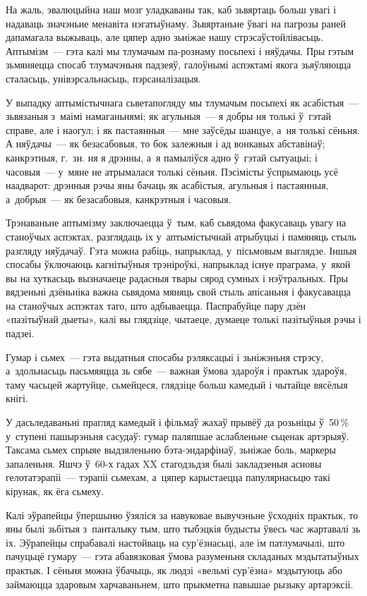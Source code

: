 На жаль, эвалюцыйна наш мозг уладкаваны так, каб зьвяртаць больш увагі і надаваць значэньне менавіта нэгатыўнаму. Зьвяртаньне ўвагі на пагрозы раней дапамагала выжываць, але цяпер адно зьніжае нашу стрэсаўстойлівасьць. Аптымізм~--- гэта калі мы тлумачым па-рознаму посьпехі і няўдачы. Пры гэтым зьмяняецца спосаб тлумачэньня падзеяў, галоўнымі аспэктамі якога зьяўляюцца сталасьць, унівэрсальнасьць, пэрсаналізацыя. 

У выпадку аптымістычнага сьветапогляду мы тлумачым посьпехі як асабістыя~--- зьвязаныя з~маімі намаганьнямі; як агульныя~--- я добры ня толькі ў~гэтай справе, але і наогул; і як пастаянныя~--- мне заўсёды шанцуе, а~ня толькі сёньня. А няўдачы~--- як безасабовыя, то бок залежныя і ад вонкавых абставінаў; канкрэтныя, г.~зн. ня я дрэнны, а~я памыліўся адно ў~гэтай сытуацыі; і часовыя~--- у~мяне не атрымалася толькі сёньня. Пэсімісты ўспрымаюць усё наадварот: дрэнныя рэчы яны бачаць як асабістыя, агульныя і пастаянныя, а~добрыя~--- як безасабовыя, канкрэтныя і часовыя.

Трэнаваньне аптымізму заключаецца ў~тым, каб сьвядома факусаваць увагу на станоўчых аспэктах, разглядаць іх у~аптымістычнай атрыбуцыі і памяняць стыль разгляду няўдачаў. Гэта можна рабіць, напрыклад, у~пісьмовым выглядзе. Іншыя спосабы ўключаюць кагнітыўныя трэніроўкі, напрыклад існуе праграма, у~якой вы на хуткасьць вызначаеце радасныя твары сярод сумных і нэўтральных. Пры вядзеньні дзёньніка важна сьвядома мяняць свой стыль апісаньня і факусавацца на станоўчых аспэктах таго, што адбываецца. Паспрабуйце пару дзён «пазітыўнай дыеты», калі вы глядзіце, чытаеце, думаеце толькі пазітыўныя рэчы і падзеі.

Гумар і сьмех~--- гэта выдатныя спосабы рэляксацыі і зьніжэньня стрэсу, а~здольнасьць пасьмяяцца зь сябе~--- важная ўмова здароўя і практык здароўя, таму часьцей жартуйце, сьмейцеся, глядзіце больш камедый і чытайце вясёлыя кнігі. 

У дасьледаваньні прагляд камедый і фільмаў жахаў прывёў да розьніцы ў~50\,\% у~ступені пашырэньня сасудаў: гумар паляпшае аслабленьне сьценак артэрыяў. Таксама сьмех спрыяе выдзяленьню бэта-эндарфінаў, зьніжае боль, маркеры запаленьня. Яшчэ ў~60-х гадах XX стагодзьдзя былі закладзеныя асновы гелотатэрапіі~--- тэрапіі сьмехам, а~цяпер карыстаецца папулярнасьцю такі кірунак, як ёга сьмеху.

Калі эўрапейцы ўпершыню ўзяліся за навуковае вывучэньне ўсходніх практык, то яны былі зьбітыя з~панталыку тым, што тыбэцкія будысты ўвесь час жартавалі зь іх. Эўрапейцы спрабавалі настойваць на сур'ёзнасьці, але ім патлумачылі, што пачуцьцё гумару~--- гэта абавязковая ўмова разуменьня складаных мэдытатыўных практык. І сёньня можна ўбачыць, як людзі «вельмі сур'ёзна» мэдытуюць або займаюцца здаровым харчаваньнем, што прыкметна павышае рызыку артарэксіі. 

